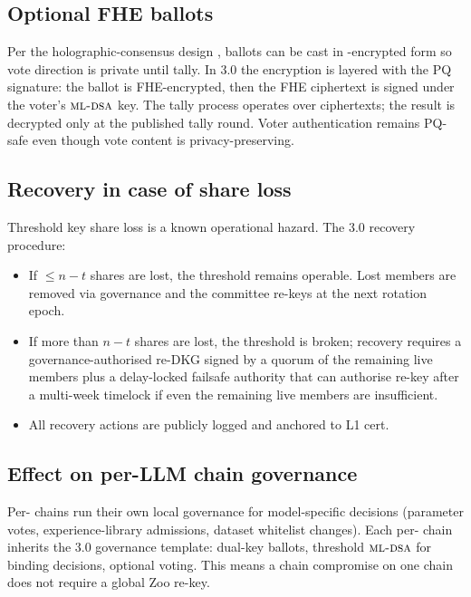 \subsection{Optional FHE ballots}

Per the holographic-consensus \DAO{} design \cite{zoo-2025-securities-and-dao},
ballots can be cast in \FHE{}-encrypted form so vote direction is
private until tally. In 3.0 the encryption is layered with the PQ
signature: the ballot is FHE-encrypted, then the FHE ciphertext is
signed under the voter's $\textsc{ml-dsa}{}$ key. The tally process operates
over ciphertexts; the result is decrypted only at the published tally
round. Voter authentication remains PQ-safe even though vote content
is privacy-preserving.

\subsection{Recovery in case of share loss}

Threshold key share loss is a known operational hazard. The 3.0
recovery procedure:

\begin{itemize}[leftmargin=1.2em]
  \item If $\leq n - t$ shares are lost, the threshold remains
        operable. Lost members are removed via governance and the
        committee re-keys at the next rotation epoch.
  \item If more than $n - t$ shares are lost, the threshold is
        broken; recovery requires a governance-authorised
        re-DKG signed by a quorum of the remaining live members
        plus a delay-locked failsafe authority that can authorise
        re-key after a multi-week timelock if even the remaining
        live members are insufficient.
  \item All recovery actions are publicly logged and anchored to L1
        cert.
\end{itemize}

\subsection{Effect on per-LLM chain governance}

Per-\LLM{} chains \cite{zoo-2025-securities-and-dao} run their own
local governance for model-specific decisions (parameter votes,
experience-library admissions, dataset whitelist changes).
Each per-\LLM{} chain inherits the 3.0 governance template: dual-key
ballots, threshold $\textsc{ml-dsa}{}$ for binding decisions, optional \FHE{}
voting. This means a chain compromise on one \LLM{} chain does not
require a global Zoo \DAO{} re-key.
